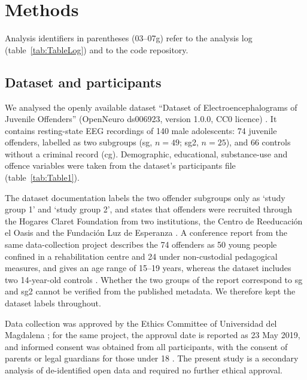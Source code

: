 
\section{Methods}
\label{sec:methods}

Analysis identifiers in parentheses (03--07g) refer to the analysis log (table~\ref{tab:TableLog}) and to the code repository.

\subsection{Dataset and participants}
\label{sec:data}

We analysed the openly available dataset ``Dataset of Electroencephalograms of Juvenile Offenders'' (OpenNeuro ds006923, version 1.0.0, CC0 licence) \cite{Polo2025ds006923}. It contains resting-state EEG recordings of 140 male adolescents: 74 juvenile offenders, labelled as two subgroups (sg, $n = 49$; sg2, $n = 25$), and 66 controls without a criminal record (cg). Demographic, educational, substance-use and offence variables were taken from the dataset's participants file (table~\ref{tab:Table1}).

The dataset documentation labels the two offender subgroups only as `study group 1' and `study group 2', and states that offenders were recruited through the Hogares Claret Foundation from two institutions, the Centro de Reeducaci\'on el Oasis and the Fundaci\'on Luz de Esperanza \cite{Polo2025ds006923}. A conference report from the same data-collection project describes the 74 offenders as 50 young people confined in a rehabilitation centre and 24 under non-custodial pedagogical measures, and gives an age range of 15--19 years, whereas the dataset includes two 14-year-old controls \cite{RodriguezAlvarez2023}. Whether the two groups of the report correspond to sg and sg2 cannot be verified from the published metadata. We therefore kept the dataset labels throughout.

Data collection was approved by the Ethics Committee of Universidad del Magdalena \cite{Polo2025ds006923}; for the same project, the approval date is reported as 23 May 2019, and informed consent was obtained from all participants, with the consent of parents or legal guardians for those under 18 \cite{SanchezTorres2024}. The present study is a secondary analysis of de-identified open data and required no further ethical approval.

